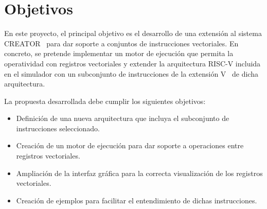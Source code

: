 \section{Objetivos}\label{sec:objectives}
En este proyecto, el principal objetivo es el desarrollo de una extensión al sistema CREATOR~\cite{camarmas2024creator} para dar soporte a conjuntos de instrucciones vectoriales. En concreto, se pretende implementar un motor de ejecución que permita la operatividad con registros vectoriales y extender la arquitectura RISC-V incluida en el simulador con un subconjunto de instrucciones de la extensión V~\cite{vec-riscv} de dicha arquitectura.

La propuesta desarrollada debe cumplir los siguientes objetivos:
\begin{itemize}
    \item Definición de una nueva arquitectura que incluya el subconjunto de instrucciones seleccionado.
    \item Creación de un motor de ejecución para dar soporte a operaciones entre registros vectoriales.
    \item Ampliación de la interfaz gráfica para la correcta visualización de los registros vectoriales.
    \item Creación de ejemplos para facilitar el entendimiento de dichas instrucciones.
\end{itemize}

